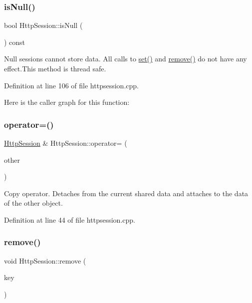 \subsubsection{\texorpdfstring{is\+Null()}{isNull()}}
{\footnotesize\ttfamily bool Http\+Session\+::is\+Null (\begin{DoxyParamCaption}{ }\end{DoxyParamCaption}) const}

Null sessions cannot store data. All calls to \mbox{\hyperlink{classstefanfrings_1_1_http_session_a777e082016803939b9ba5b7e4a7c9ab0}{set()}} and \mbox{\hyperlink{classstefanfrings_1_1_http_session_a57e5a59ce0106b0fa8cf9c4086d5a6b1}{remove()}} do not have any effect.\+This method is thread safe. 

Definition at line 106 of file httpsession.\+cpp.

Here is the caller graph for this function\+:
\mbox{\label{classstefanfrings_1_1_http_session_a7b72ecf4dfe0935545c461f461a8a1a5}} 
\subsubsection{\texorpdfstring{operator=()}{operator=()}}
{\footnotesize\ttfamily \mbox{\hyperlink{classstefanfrings_1_1_http_session}{Http\+Session}} \& Http\+Session\+::operator= (\begin{DoxyParamCaption}\item[{const \mbox{\hyperlink{classstefanfrings_1_1_http_session}{Http\+Session}} \&}]{other }\end{DoxyParamCaption})}

Copy operator. Detaches from the current shared data and attaches to the data of the other object. 

Definition at line 44 of file httpsession.\+cpp.

\mbox{\label{classstefanfrings_1_1_http_session_a57e5a59ce0106b0fa8cf9c4086d5a6b1}} 
\subsubsection{\texorpdfstring{remove()}{remove()}}
{\footnotesize\ttfamily void Http\+Session\+::remove (\begin{DoxyParamCaption}\item[{const Q\+Byte\+Array \&}]{key }\end{DoxyParamCaption})}

